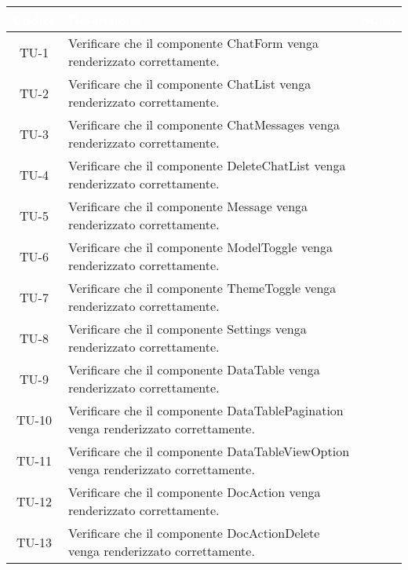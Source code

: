 \begingroup
\setlength{\tabcolsep}{10pt}
\renewcommand{\arraystretch}{1.5}
\begin{xltabular}{\textwidth}{| c | X | c |}
    \hline
     \textbf{\textcolor{white}{Codice}} & \textbf{\textcolor{white}{Descrizione}} & \textbf{\textcolor{white}{Stato}}\\
    \hline
    \endhead
    TU-1 & Verificare che il componente ChatForm venga renderizzato correttamente. & \textcolor{cmarkcolor}{} \\
    \hline
    TU-2 & Verificare che il componente ChatList venga renderizzato correttamente. & \textcolor{cmarkcolor}{} \\
    \hline
    TU-3 & Verificare che il componente ChatMessages venga renderizzato correttamente. & \textcolor{cmarkcolor}{} \\
    \hline
    TU-4 & Verificare che il componente DeleteChatList venga renderizzato correttamente. & \textcolor{cmarkcolor}{} \\
    \hline
    TU-5 & Verificare che il componente Message venga renderizzato correttamente. & \textcolor{cmarkcolor}{} \\
    \hline
    TU-6 & Verificare che il componente ModelToggle venga renderizzato correttamente. & \textcolor{cmarkcolor}{} \\
    \hline
    TU-7 & Verificare che il componente ThemeToggle venga renderizzato correttamente. & \textcolor{cmarkcolor}{} \\
    \hline
    TU-8 & Verificare che il componente Settings venga renderizzato correttamente. & \textcolor{cmarkcolor}{} \\
    \hline
    TU-9 & Verificare che il componente DataTable venga renderizzato correttamente. & \textcolor{cmarkcolor}{} \\
    \hline
    TU-10 & Verificare che il componente DataTablePagination venga renderizzato correttamente. & \textcolor{cmarkcolor}{} \\
    \hline
    TU-11 & Verificare che il componente DataTableViewOption venga renderizzato correttamente. & \textcolor{cmarkcolor}{} \\
    \hline
    TU-12 & Verificare che il componente DocAction venga renderizzato correttamente. & \textcolor{cmarkcolor}{} \\
    \hline
    TU-13 & Verificare che il componente DocActionDelete venga renderizzato correttamente. & \textcolor{cmarkcolor}{} \\

\end{xltabular}
